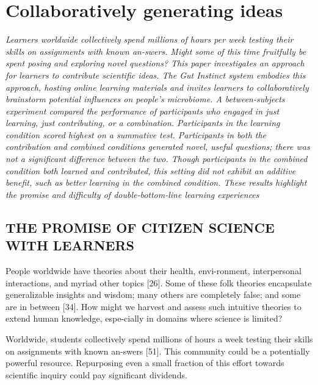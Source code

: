 
\chapter{Collaboratively generating ideas}



\textit{Learners worldwide collectively spend millions of hours per week testing their skills on assignments with known an-swers. Might some of this time fruitfully be spent posing and exploring novel questions? This paper investigates an approach for learners to contribute scientific ideas. The Gut Instinct system embodies this approach, hosting online learning materials and invites learners to collaboratively brainstorm potential influences on people’s microbiome. A between-subjects experiment compared the performance of participants who engaged in just learning, just contributing, or a combination. Participants in the learning condition scored highest on a summative test. Participants in both the contribution and combined conditions generated novel, useful questions; there was not a significant difference between the two. Though participants in the combined condition both learned and contributed, this setting did not exhibit an additive benefit, such as better learning in the combined condition. These results highlight the promise and difficulty of double-bottom-line learning experiences}

\section{THE PROMISE OF CITIZEN SCIENCE WITH LEARNERS}
People worldwide have theories about their health, envi-ronment, interpersonal interactions, and myriad other topics [26]. Some of these folk theories encapsulate generalizable insights and wisdom; many others are completely false; and some are in between [34]. How might we harvest and assess such intuitive theories to extend human knowledge, espe-cially in domains where science is limited? 

Worldwide, students collectively spend millions of hours a week testing their skills on assignments with known an-swers [51]. This community could be a potentially powerful resource. Repurposing even a small fraction of this effort towards scientific inquiry could pay significant dividends. 

